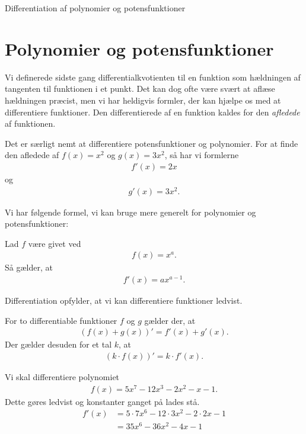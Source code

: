 \begin{center}
\Huge
Differentiation af polynomier og potensfunktioner
\end{center}
\section*{Polynomier og potensfunktioner}

Vi definerede sidste gang differentialkvotienten til en funktion som hældningen af tangenten til funktionen i et punkt. Det kan dog ofte være svært at aflæse hældningen præcist, men vi har heldigvis formler, der kan hjælpe os med at differentiere funktioner. Den differentierede af en funktion kaldes for den \textit{afledede} af funktionen. 

\begin{exa}
	Det er særligt nemt at differentiere potensfunktioner og polynomier. For at finde den afledede af $f(x) = 
	x^2$ og $g(x) = 3x^2$, så har vi formlerne
	\begin{align*}
		f'(x) = 2x
	\end{align*}
	og 
	\begin{align*}
		g'(x) = 3x^2.
	\end{align*}
\end{exa}

Vi har følgende formel, vi kan bruge mere generelt for polynomier og potensfunktioner:

\begin{setn}
	Lad $f$ være givet ved
	\begin{align*}
		f(x) = x^a.
	\end{align*}
	Så gælder, at 
	\begin{align*}
		f'(x) = ax^{a-1}.
	\end{align*}
\end{setn}

Differentiation opfylder, at vi kan differentiere funktioner ledvist.
\begin{setn}[Linearitet]
	For to differentiable funktioner $f$ og $g$ gælder der, at 
	\begin{align*}
		(f(x)+g(x))' = f'(x) + g'(x).
	\end{align*}
	Der gælder desuden for et tal $k$, at
	\begin{align*}
		(k\cdot f(x) )' = k\cdot f'(x).
	\end{align*}
\end{setn}

\begin{exa}
	Vi skal differentiere polynomiet 
	\begin{align*}
		f(x) = 5x^7-12x^3-2x^2-x-1.
	\end{align*}
	Dette gøres ledvist og konstanter ganget på lades stå.
	\begin{align*}
		f'(x) &= 5\cdot 7x^6 - 12\cdot 3x^2-2\cdot 2x-1\\
		&= 35x^6-36x^2-4x-1
	\end{align*}
\end{exa}

